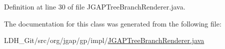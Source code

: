 Definition at line 30 of file J\-G\-A\-P\-Tree\-Branch\-Renderer.\-java.



The documentation for this class was generated from the following file\-:\begin{DoxyCompactItemize}
\item 
L\-D\-H\-\_\-\-Git/src/org/jgap/gp/impl/\hyperlink{_j_g_a_p_tree_branch_renderer_8java}{J\-G\-A\-P\-Tree\-Branch\-Renderer.\-java}\end{DoxyCompactItemize}
